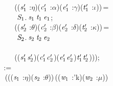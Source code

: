 \,\,\,\,\,\,\,\,\,\,\,\,\,\,\,\,\,\,\,((\ensuremath{\HOLBoundVar{s}\sb{\mathrm{1}}\sp{\prime{}}} :\ensuremath{\eta})\HOLSymConst{,}(\ensuremath{\HOLBoundVar{c}\sb{\mathrm{1}}\sp{\prime{}}} :\ensuremath{\alpha})\HOLSymConst{,}(\ensuremath{\HOLBoundVar{e}\sb{\mathrm{1}}\sp{\prime{}}} :\ensuremath{\gamma})\HOLSymConst{,}(\ensuremath{\HOLBoundVar{t}\sb{\mathrm{1}}\sp{\prime{}}} :\ensuremath{\iota}))\,=\\
\,\,\,\,\,\,\,\,\,\,\,\,\,\,\,\,\,\,\,\,\,\ensuremath{\HOLFreeVar{S}\sb{\mathrm{1}}}.\,\ensuremath{\HOLBoundVar{s}\sb{\mathrm{1}}}\,\ensuremath{\HOLBoundVar{t}\sb{\mathrm{1}}}\,\ensuremath{\HOLBoundVar{e}\sb{\mathrm{1}}};\\
\,\,\,\,\,\,\,\,\,\,\,\,\,\,\,\,\,\,\,((\ensuremath{\HOLBoundVar{s}\sb{\mathrm{2}}\sp{\prime{}}} :\ensuremath{\theta})\HOLSymConst{,}(\ensuremath{\HOLBoundVar{c}\sb{\mathrm{2}}\sp{\prime{}}} :\ensuremath{\beta})\HOLSymConst{,}(\ensuremath{\HOLBoundVar{e}\sb{\mathrm{2}}\sp{\prime{}}} :\ensuremath{\delta})\HOLSymConst{,}(\ensuremath{\HOLBoundVar{t}\sb{\mathrm{2}}\sp{\prime{}}} :\ensuremath{\kappa}))\,=\\
\,\,\,\,\,\,\,\,\,\,\,\,\,\,\,\,\,\,\,\,\,\ensuremath{\HOLFreeVar{S}\sb{\mathrm{2}}}.\,\ensuremath{\HOLBoundVar{s}\sb{\mathrm{2}}}\,\ensuremath{\HOLBoundVar{t}\sb{\mathrm{2}}}\,\ensuremath{\HOLBoundVar{e}\sb{\mathrm{2}}}\\
\,\,\,\,\,\,\,\,\,\,\,\,\,\,\,\,\,\\
\,\,\,\,\,\,\,\,\,\,\,\,\,\,\,\,\,\,\,((\ensuremath{\HOLBoundVar{s}\sb{\mathrm{1}}\sp{\prime{}}}\HOLSymConst{,}\ensuremath{\HOLBoundVar{s}\sb{\mathrm{2}}\sp{\prime{}}})\HOLSymConst{,}(\ensuremath{\HOLBoundVar{c}\sb{\mathrm{1}}\sp{\prime{}}}\HOLSymConst{,}\ensuremath{\HOLBoundVar{c}\sb{\mathrm{2}}\sp{\prime{}}})\HOLSymConst{,}(\ensuremath{\HOLBoundVar{e}\sb{\mathrm{1}}\sp{\prime{}}}\HOLSymConst{,}\ensuremath{\HOLBoundVar{e}\sb{\mathrm{2}}\sp{\prime{}}})\HOLSymConst{,}\ensuremath{\HOLBoundVar{t}\sb{\mathrm{1}}\sp{\prime{}}}\HOLSymConst{,}\ensuremath{\HOLBoundVar{t}\sb{\mathrm{2}}\sp{\prime{}}})));\\
\,\,\,\,\,\,\,\,\,\,:=\\
\,\,\,\,\,\,\,\,\,\,\,(\HOLTokenLambda{}((\ensuremath{\HOLBoundVar{s}\sb{\mathrm{1}}} :\ensuremath{\eta})\HOLSymConst{,}(\ensuremath{\HOLBoundVar{s}\sb{\mathrm{2}}} :\ensuremath{\theta}))\,((\ensuremath{\HOLBoundVar{w}\sb{\mathrm{1}}} :'k)\HOLSymConst{,}(\ensuremath{\HOLBoundVar{w}\sb{\mathrm{2}}} :\ensuremath{\mu}))\\
